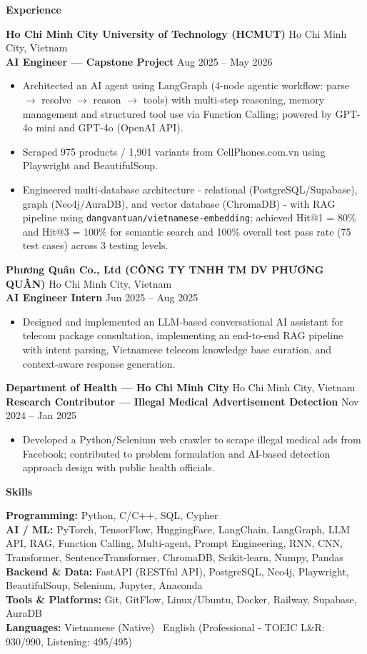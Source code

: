 \documentclass[10pt]{article}
\newcommand{\sep}{\textbullet\ }
\newcommand{\resumeSection}[1]{%
  \par\vspace{13pt}%
  {\centering\textbf{#1}\par}%
  \vspace{6pt}%
}
\newcommand{\resumeSubheading}[4]{%
  \textbf{#1} \hfill #2\\
  \textbf{#3} \hfill #4%
}
\newcommand{\entrygap}{\vspace{10pt}}
\begin{document}
\resumeSection{Experience}

\resumeSubheading
  {Ho Chi Minh City University of Technology (HCMUT)}{Ho Chi Minh City, Vietnam}
  {AI Engineer --- Capstone Project}{Aug 2025 -- May 2026}
\begin{itemize}
    \item Architected an AI agent using LangGraph (4-node agentic workflow: parse $\rightarrow$ resolve $\rightarrow$ reason $\rightarrow$ tools) with multi-step reasoning, memory management and structured tool use via Function Calling; powered by GPT-4o mini and GPT-4o (OpenAI API).
    \item Scraped 975 products / 1,901 variants from CellPhones.com.vn using Playwright and BeautifulSoup.
    \item Engineered multi-database architecture - relational (PostgreSQL/Supabase), graph (Neo4j/AuraDB), and vector database (ChromaDB) - with RAG pipeline using \texttt{dangvantuan/vietnamese-embedding}; achieved Hit@1 = 80\% and Hit@3 = 100\% for semantic search and 100\% overall test pass rate (75 test cases) across 3 testing levels.
\end{itemize}

\entrygap
\resumeSubheading
  {Phương Quân Co., Ltd (CÔNG TY TNHH TM DV PHƯƠNG QUÂN)}{Ho Chi Minh City, Vietnam}
  {AI Engineer Intern}{Jun 2025 -- Aug 2025}
\begin{itemize}
    \item Designed and implemented an LLM-based conversational AI assistant for telecom package consultation, implementing an end-to-end RAG pipeline with intent parsing, Vietnamese telecom knowledge base curation, and context-aware response generation.
\end{itemize}

\entrygap
\resumeSubheading
  {Department of Health --- Ho Chi Minh City}{Ho Chi Minh City, Vietnam}
  {Research Contributor --- Illegal Medical Advertisement Detection}{Nov 2024 -- Jan 2025}
\begin{itemize}
    \item Developed a Python/Selenium web crawler to scrape illegal medical ads from Facebook; contributed to problem formulation and AI-based detection approach design with public health officials.
\end{itemize}

\resumeSection{Skills}

\textbf{Programming:} Python, C/C++, SQL, Cypher\\
\textbf{AI / ML:} PyTorch, TensorFlow, HuggingFace, LangChain, LangGraph, LLM API, RAG, Function Calling, Multi-agent, Prompt Engineering, RNN, CNN, Transformer, SentenceTransformer, ChromaDB, Scikit-learn, Numpy, Pandas\\
\textbf{Backend \& Data:} FastAPI (RESTful API), PostgreSQL, Neo4j, Playwright, BeautifulSoup, Selenium, Jupyter, Anaconda\\
\textbf{Tools \& Platforms:} Git, GitFlow, Linux/Ubuntu, Docker, Railway, Supabase, AuraDB\\
\textbf{Languages:} Vietnamese (Native) \sep English (Professional - TOEIC L\&R: 930/990, Listening: 495/495)
\end{document}
